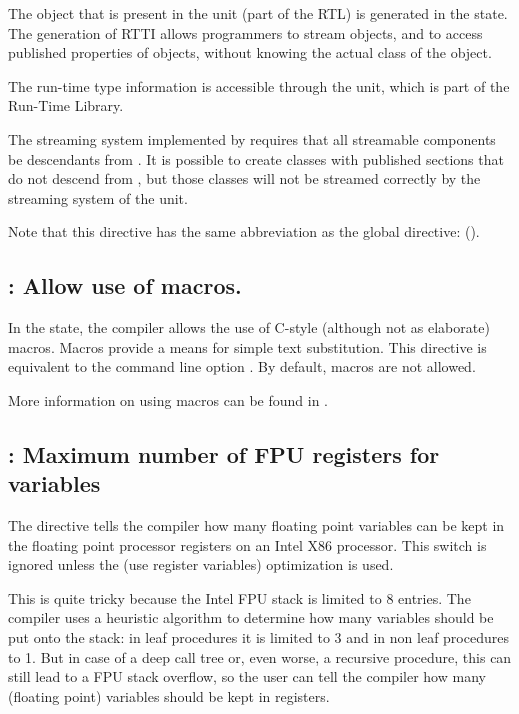 The  object that is present in the  unit 
(part of the RTL) is generated in the  state. The generation 
of RTTI allows programmers to stream objects, and to access published 
properties of objects, without knowing the actual class of the object.

The run-time type information is accessible through the  unit,
which is part of the \fpc Run-Time Library.

\begin{remark}
The streaming system implemented by \fpc requires that all
streamable components be descendants from . It is possible
to create classes with published sections that do not descend from
, but those classes will not be streamed correctly by the
streaming system of the  unit. 
\end{remark}

Note that this directive has the same abbreviation as the global 
directive:  ().

\subsection{ : Allow use of macros.}

In the  state, the compiler allows the use of C-style
(although not as elaborate) macros. Macros provide a means for simple text
substitution. This directive is equivalent to the command line option .
By default, macros are not allowed.

More information on using macros can be found in . 


\subsection{ : Maximum number of FPU registers for variables}

The  directive tells the compiler how many floating point
variables can be kept in the floating point processor registers on an Intel
X86 processor. This switch is ignored unless the  (use register variables) 
optimization is used.

This is quite tricky because the Intel FPU stack is limited to 8 entries.
The compiler uses a heuristic algorithm to determine how many variables should be
put onto the stack: in leaf procedures it is limited to 3 and in non leaf
procedures to 1. But in case of a deep call tree or, even worse, a recursive
procedure, this can still lead to a FPU stack overflow, so the user can tell
the compiler how many (floating point) variables should be kept in registers.


